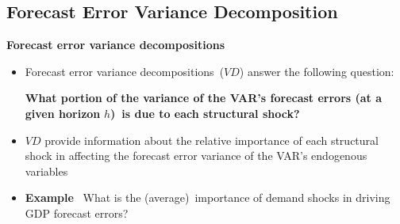 \documentclass[10pt,english,t,aspectratio=169,ignorenonframetext]{beamer}
\begin{document}

\subsection{Forecast Error Variance Decomposition}

\begin{frame}
\vspace{3cm} \color{title}\bigskip

\color{note}
\end{frame}


\begin{frame}
{\textbf{Forecast error variance decompositions}}\bigskip \bigskip

\begin{itemize}
\item Forecast error variance decompositions\ ($VD$) answer the following
question:\bigskip

\textbf{What portion of the variance of the VAR's forecast errors (at a
given horizon }$h$\textbf{)\ is due to each structural shock?}\bigskip
\medskip \pause

\item $VD$ provide information about the relative importance of each
structural shock in affecting the forecast error variance of the VAR's
endogenous variables\bigskip \medskip

\item \textbf{Example} \ What is the (average)\ importance of demand shocks
in driving GDP forecast errors?
\end{itemize}
\end{frame}

\end{document}
